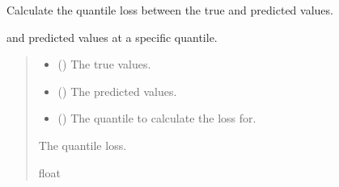 \documentclass[letterpaper,10pt,english]{sphinxmanual}
\begin{document}

\begin{fulllineitems}
\label{\detokenize{src_demand_forecast.models:src_demand_forecast.models.train_model.quantile_loss}}
\pysigstartsignatures
{}
\pysigstopsignatures
\sphinxAtStartPar
Calculate the quantile loss between the true and predicted values.
\begin{description}
\sphinxAtStartPar
and predicted values at a specific quantile.

\end{description}
\begin{quote}\begin{description}
\begin{itemize}
\item {} 
\sphinxAtStartPar
{} () \textendash{} The true values.

\item {} 
\sphinxAtStartPar
{} () \textendash{} The predicted values.

\item {} 
\sphinxAtStartPar
{} () \textendash{} The quantile to calculate the loss for.

\end{itemize}

\sphinxAtStartPar
The quantile loss.

\sphinxAtStartPar
float

\end{description}\end{quote}

\end{fulllineitems}
\end{document}
